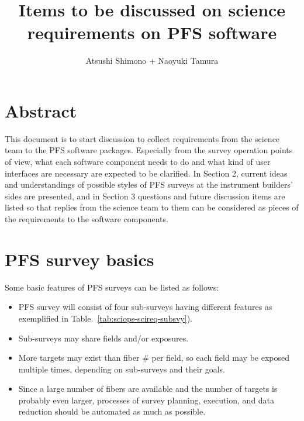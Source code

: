 \documentclass[a4paper,notitlepage]{article}
\title{Items to be discussed on science requirements on PFS software}
\author{Atsushi Shimono + Naoyuki Tamura}
\begin{document}

\ssnhead

\section{Abstract}

This document is to start discussion to collect requirements from the
science team to the PFS software packages. Especially from the survey
operation points of view, what each software component needs to do and
what kind of user interfaces are necessary are expected to be
clarified. In Section 2, current ideas and understandings of possible
styles of PFS surveys at the instrument builders' sides are presented,
and in Section 3 questions and future discussion items are listed so
that replies from the science team to them can be considered as pieces
of the requirements to the software components.

\section{PFS survey basics}

Some basic features of PFS surveys can be listed as follows:
\begin{itemize}
 \item PFS survey will consist of four sub-surveys having different
       features as exemplified in
       Table.~\ref{tab:sciops-scireq-subsvy}).
 \item Sub-surveys may share fields and/or exposures.
 \item More targets may exist than fiber \# per field, so each field
       may be exposed multiple times, depending on sub-surveys and
       their goals.
 \item Since a large number of fibers are available and the number of
       targets is probably even larger, processes of survey planning,
       execution, and data reduction should be automated as much as
       possible.
\end{itemize}
\end{document}
